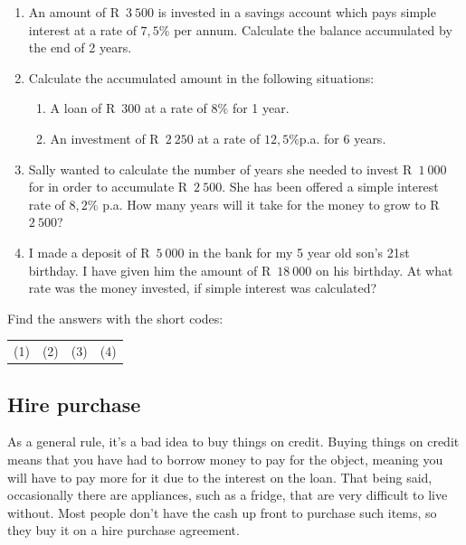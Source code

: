 \begin{exercises}{}{
    \begin{enumerate}[itemsep=6pt, label=\textbf{\arabic*}.]
	\item An amount of R~$3~500$ is invested in a savings account which pays simple interest at a rate of $7,5\%$ per annum. Calculate the balance accumulated by the end of 2 years.

	\item Calculate the accumulated amount in the following situations:
	\begin{enumerate}[noitemsep, label=\textbf{(\alph*)} ]
	    \item A loan of R~$300$ at a rate of $8\%$ for 1 year.

	    \item An investment of R~$2~250$ at a rate of $12,5\%$p.a. for 6 years.
	\end{enumerate}

	\item Sally wanted to calculate the number of years she needed to invest R~$1~000$ for in order to accumulate R~$2~500$. She has been offered a simple interest rate of $8,2\%$ p.a. How many years will it take for the money to grow to R~$2~500$?

	\item I made a deposit of R~$5~000$ in the bank for my 5 year old son’s 21st birthday. I have given him the amount of R~$18~000$ on his birthday. At what rate was the money invested, if simple interest was calculated?\\
    \end{enumerate}

    Find the answers with the short codes:\\
    \begin{tabularx}{\textwidth}{ XXXX }
	(1)	&	(2)	&	(3)	&	(4)\\
    \end{tabularx}
}
\end{exercises}


\subsection{Hire purchase}

As a general rule, it’s a bad idea to buy things on credit. Buying things on credit means that you have had to borrow money to pay for the object, meaning you will have to pay more for it due to the interest on the loan. That being said, occasionally there are appliances, such as a fridge, that are very difficult to live without. Most people don’t have the cash up front to purchase such items, so they buy it on a hire purchase agreement.\par

